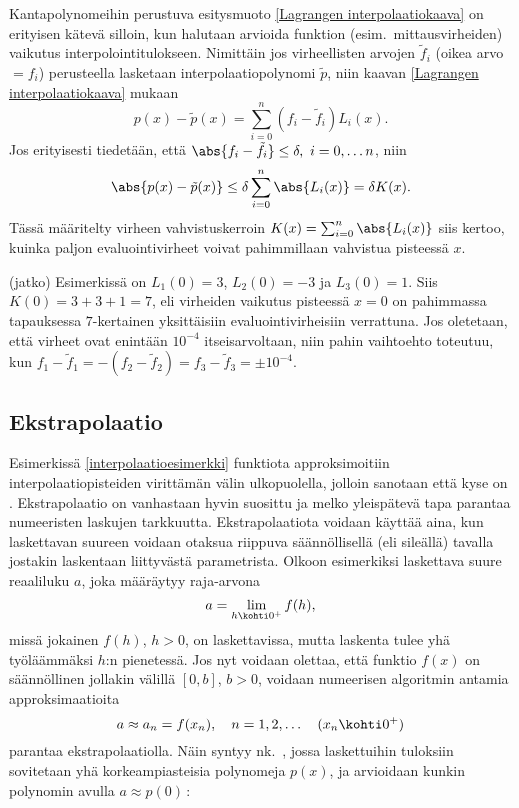 Kantapolynomeihin perustuva esitysmuoto \eqref{Lagrangen interpolaatiokaava} on erityisen
kätevä silloin, kun halutaan arvioida funktion   
(esim.\ mittausvirheiden) vaikutus interpolointitulokseen. Nimittäin jos virheellisten arvojen
$\tilde{f}_i$ (oikea arvo $=f_i$) perusteella lasketaan interpolaatiopolynomi $\tilde{p}$, niin
kaavan \eqref{Lagrangen interpolaatiokaava} mukaan
\[ 
p(x)-\tilde{p}(x) = \sum_{i=0}^n (f_i-\tilde{f}_i) L_i(x). 
\]
Jos erityisesti tiedetään, että $\abs{f_i-\tilde{f}_i} \le \delta,\ i=0,\ldots n$, niin
\[ 
\abs{p(x)-\tilde{p}(x)} \le \delta \sum_{i=0}^n \abs{L_i(x)} = \delta K(x). 
\]
Tässä määritelty virheen vahvistuskerroin $K(x)=\sum_{i=0}^n \abs{L_i(x)}$ siis kertoo, kuinka
paljon evaluointivirheet voivat pahimmillaan vahvistua pisteessä $x$.
\jatko \begin{Exa} (jatko) Esimerkissä on $L_1(0)=3$, $L_2(0)=-3$ ja $L_3(0)=1$. Siis
$K(0)=3+3+1=7$, eli virheiden vaikutus pisteessä $x=0$ on pahimmassa tapauksessa $7$-kertainen
yksittäisiin evaluointivirheisiin verrattuna. Jos oletetaan, että virheet ovat enintään
$10^{-4}$ itseisarvoltaan, niin pahin vaihtoehto toteutuu, kun
$f_1-\tilde{f}_1=-(f_2-\tilde{f}_2)=f_3-\tilde{f}_3=\pm 10^{-4}$. \loppu
\end{Exa}

\subsection{Ekstrapolaatio}

Esimerkissä \ref{interpolaatioesimerkki} funktiota approksimoitiin interpolaatiopisteiden 
virittämän välin ulkopuolella, jolloin sanotaan että kyse on . 
Ekstrapolaatio on vanhastaan hyvin suosittu ja melko yleispätevä tapa parantaa numeeristen 
laskujen tarkkuutta. Ekstrapolaatiota voidaan käyttää aina, kun laskettavan suureen voidaan 
otaksua riippuva säännöllisellä (eli sileällä) tavalla jostakin laskentaan liittyvästä 
parametrista. Olkoon esimerkiksi laskettava suure reaaliluku $a$, joka määräytyy raja-arvona
\[
a=\lim_{h\kohti 0^+} f(h),
\]
missä jokainen $f(h)$, $h>0$, on laskettavissa, mutta laskenta tulee yhä työläämmäksi $h$:n 
pienetessä. Jos nyt voidaan olettaa, että funktio $f(x)$ on säännöllinen jollakin välillä 
$[0,b]$, $b>0$, voidaan numeerisen algoritmin antamia approksimaatioita
\[
a\approx a_n=f(x_n),\quad n=1,2,\ldots\quad (x_n\kohti 0^+)
\]
parantaa ekstrapolaatiolla. Näin syntyy nk.\ , jossa laskettuihin 
tuloksiin sovitetaan yhä korkeampiasteisia polynomeja $p(x)$, ja arvioidaan kunkin polynomin
avulla $a\approx p(0)$\,:

